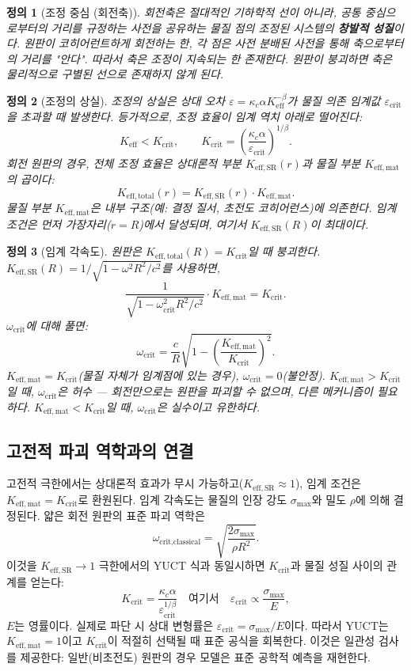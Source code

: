 \documentclass[12pt,a4paper]{article}
\newtheorem{definition}{정의}[section]
\newcommand{\kappac}{\kappa_c}
\newcommand{\betaf}{\beta}
\newcommand{\Keff}{K_{\mathrm{eff}}}
\newcommand{\Keffmat}{K_{\mathrm{eff,mat}}}
\newcommand{\Kefftot}{K_{\mathrm{eff,total}}}
\newcommand{\KeffSR}{K_{\mathrm{eff,SR}}}
\newcommand{\Kcrit}{K_{\mathrm{crit}}}
\begin{document}
	\begin{definition}[조정 중심 (회전축)]
		회전축은 절대적인 기하학적 선이 아니라, 공통 중심으로부터의 거리를 규정하는 사전을 공유하는 물질 점의 조정된 시스템의 \textbf{창발적 성질}이다. 원판이 코히어런트하게 회전하는 한, 각 점은 사전 분배된 사전을 통해 축으로부터의 거리를 "안다". 따라서 축은 조정이 지속되는 한 존재한다. 원판이 붕괴하면 축은 물리적으로 구별된 선으로 존재하지 않게 된다.
	\end{definition}
	
	\begin{definition}[조정의 상실]
		조정의 상실은 상대 오차 \(\varepsilon = \kappac \alpha K_{\mathrm{eff}}^{-\betaf}\)가 물질 의존 임계값 \(\varepsilon_{\text{crit}}\)을 초과할 때 발생한다. 등가적으로, 조정 효율이 임계 역치 아래로 떨어진다:
		\[
		\Keff < \Kcrit, \qquad \Kcrit = \left( \frac{\kappac \alpha}{\varepsilon_{\text{crit}}} \right)^{1/\betaf}.
		\]
		회전 원판의 경우, 전체 조정 효율은 상대론적 부분 \(K_{\mathrm{eff,SR}}(r)\)과 물질 부분 \(K_{\mathrm{eff,mat}}\)의 곱이다:
		\[
		\Kefftot(r) = \KeffSR(r) \cdot \Keffmat.
		\]
		물질 부분 \(K_{\mathrm{eff,mat}}\)은 내부 구조(예: 결정 질서, 초전도 코히어런스)에 의존한다. 임계 조건은 먼저 가장자리(\(r = R\))에서 달성되며, 여기서 \(\KeffSR(R)\)이 최대이다.
	\end{definition}
	
	\begin{definition}[임계 각속도]
		원판은 \(\Kefftot(R) = \Kcrit\)일 때 붕괴한다. \(\KeffSR(R) = 1/\sqrt{1 - \omega^2 R^2/c^2}\)를 사용하면,
		\[
		\frac{1}{\sqrt{1 - \omega_{\text{crit}}^2 R^2/c^2}} \cdot \Keffmat = \Kcrit.
		\]
		\(\omega_{\text{crit}}\)에 대해 풀면:
		\[
		\boxed{\omega_{\text{crit}} = \frac{c}{R} \sqrt{1 - \left( \frac{\Keffmat}{\Kcrit} \right)^2 }}.
		\]
		\(\Keffmat = \Kcrit\)(물질 자체가 임계점에 있는 경우), \(\omega_{\text{crit}} = 0\)(불안정). \(\Keffmat > \Kcrit\)일 때, \(\omega_{\text{crit}}\)은 허수 — 회전만으로는 원판을 파괴할 수 없으며, 다른 메커니즘이 필요하다. \(\Keffmat < \Kcrit\)일 때, \(\omega_{\text{crit}}\)은 실수이고 유한하다.
	\end{definition}
	
	\subsection{고전적 파괴 역학과의 연결}
	
	고전적 극한에서는 상대론적 효과가 무시 가능하고(\(\KeffSR \approx 1\)), 임계 조건은 \(\Keffmat = \Kcrit\)로 환원된다. 임계 각속도는 물질의 인장 강도 \(\sigma_{\text{max}}\)와 밀도 \(\rho\)에 의해 결정된다. 얇은 회전 원판의 표준 파괴 역학은
	\[
	\omega_{\text{crit,classical}} = \sqrt{\frac{2\sigma_{\text{max}}}{\rho R^2}}.
	\]
	이것을 \(\KeffSR \to 1\) 극한에서의 YUCT 식과 동일시하면 \(\Kcrit\)과 물질 성질 사이의 관계를 얻는다:
	\[
	\Kcrit = \frac{\kappac \alpha}{\varepsilon_{\text{crit}}^{1/\betaf}} \quad \text{여기서} \quad \varepsilon_{\text{crit}} \propto \frac{\sigma_{\text{max}}}{E},
	\]
	\(E\)는 영률이다. 실제로 파단 시 상대 변형률은 \(\varepsilon_{\text{crit}} = \sigma_{\text{max}}/E\)이다. 따라서 YUCT는 \(\Keffmat = 1\)이고 \(\Kcrit\)이 적절히 선택될 때 표준 공식을 회복한다. 이것은 일관성 검사를 제공한다: 일반(비초전도) 원판의 경우 모델은 표준 공학적 예측을 재현한다.
	
\end{document}
